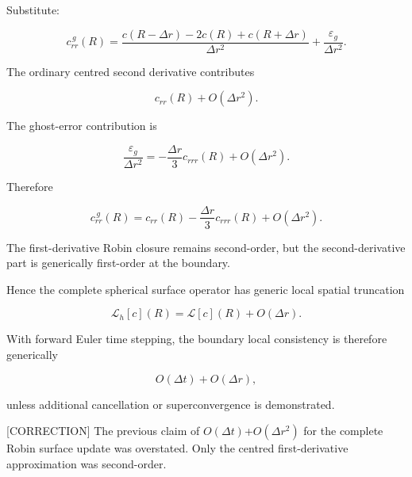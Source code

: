 \documentclass[11pt,a4paper]{article}
\begin{document}
Substitute:

\begin{equation}
c_{rr}^{\,g}(R)
=
\frac{
c(R-\Delta r)-2c(R)+c(R+\Delta r)
}{
\Delta r^2
}
+
\frac{\varepsilon_g}{\Delta r^2}.
\tag{TRISO-DIS-465}
\label{eq:triso-dis-465}
\end{equation}

The ordinary centred second derivative contributes

\begin{equation}
c_{rr}(R)+O(\Delta r^2).
\tag{TRISO-DIS-466}
\label{eq:triso-dis-466}
\end{equation}

The ghost-error contribution is

\begin{equation}
\frac{\varepsilon_g}{\Delta r^2}
=
-\frac{\Delta r}{3}c_{rrr}(R)
+
O(\Delta r^2).
\tag{TRISO-DIS-467}
\label{eq:triso-dis-467}
\end{equation}

Therefore

\begin{equation}
\boxed{
c_{rr}^{\,g}(R)
=
c_{rr}(R)
-
\frac{\Delta r}{3}c_{rrr}(R)
+
O(\Delta r^2).
}
\tag{TRISO-DIS-468}
\label{eq:triso-dis-468}
\end{equation}

The first-derivative Robin closure remains second-order, but the second-derivative part is generically first-order at the boundary.

Hence the complete spherical surface operator has generic local spatial truncation

\begin{equation}
\boxed{
\mathcal L_h[c](R)
=
\mathcal L[c](R)
+
O(\Delta r).
}
\tag{TRISO-DIS-469}
\label{eq:triso-dis-469}
\end{equation}

With forward Euler time stepping, the boundary local consistency is therefore generically

\begin{equation}
\boxed{
O(\Delta t)+O(\Delta r),
}
\tag{TRISO-DIS-470}
\label{eq:triso-dis-470}
\end{equation}

unless additional cancellation or superconvergence is demonstrated.

[CORRECTION] The previous claim of $O(\Delta t)$+$O(\Delta r^2)$ for the complete Robin surface update was overstated. Only the centred first-derivative approximation was second-order.
\end{document}
